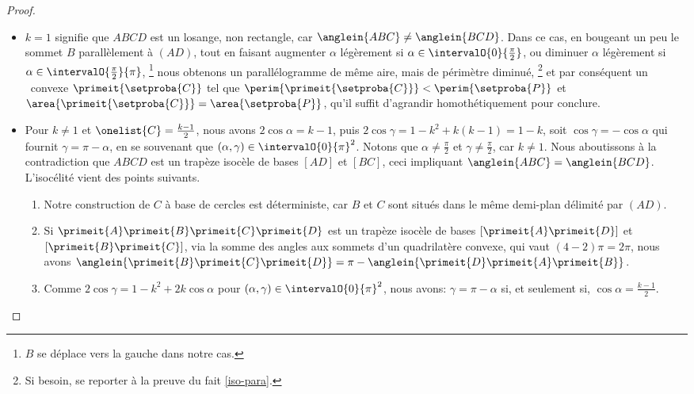 \begin{proof}
\begin{itemize}
        \item $k = 1$ signifie que $ABCD$ est un losange, non rectangle, car $\anglein{ABC} \neq \anglein{BCD}$.
        Dans ce cas, en bougeant un peu le sommet $B$ parallèlement à $(AD)$, tout en faisant
        augmenter $\alpha$ légèrement si $\alpha \in \intervalO{0}{\frac{\pi}{2}}$,
        ou
        diminuer $\alpha$ légèrement si $\alpha \in \intervalO{\frac{\pi}{2}}{\pi}$,%
        \footnote{
            $B$ se déplace vers la gauche dans notre cas.
        }
        nous obtenons un parallélogramme de même aire, mais de périmètre diminué,%
        \footnote{
            Si besoin, se reporter à la preuve du fait \ref{iso-para}.
        }
        et par conséquent un \ngone\ convexe $\primeit{\setproba{C}}$ tel que
        $\perim{\primeit{\setproba{C}}} < \perim{\setproba{P}}$
        et
        $\area{\primeit{\setproba{C}}} = \area{\setproba{P}}$,
        qu'il suffit d'agrandir homothétiquement pour conclure.


        \item Pour $k \neq 1$ et $\onelist{C} = \frac{k - 1}{2}$,
        nous avons $2\cos \alpha = k - 1$,
        puis
        $2 \cos \gamma = 1 - k^2 + k(k - 1) = 1 - k$,
        soit
        $\cos \gamma = - \cos \alpha$ qui fournit
        $\gamma = \pi - \alpha$, en se souvenant que $(\alpha , \gamma) \in \intervalO{0}{\pi}^2$.
        Notons que $\alpha \neq \frac{\pi}{2}$ et $\gamma \neq \frac{\pi}{2}$, car $k \neq 1$.
        Nous aboutissons à la contradiction que $ABCD$ est un trapèze isocèle de bases $[AD]$ et $[BC]$, ceci impliquant $\anglein{ABC} = \anglein{BCD}$.
        L'isocélité vient des points suivants.
        \begin{enumerate}
            \item Notre construction de $C$ à base de cercles est déterministe, car $B$ et $C$ sont situés dans le même demi-plan délimité par $(AD)$.

            \item Si $\primeit{A} \primeit{B} \primeit{C} \primeit{D}$ est un trapèze isocèle de bases $[\primeit{A} \primeit{D}]$ et $[\primeit{B} \primeit{C}]$, via la somme des angles aux sommets d'un quadrilatère convexe, qui vaut $(4 - 2) \pi = 2 \pi$, nous avons
            $\anglein{\primeit{B} \primeit{C} \primeit{D}} = \pi - \anglein{\primeit{D} \primeit{A} \primeit{B}}$.

            \item Comme $2 \cos \gamma = 1 - k^2 + 2 k \cos \alpha$ pour $(\alpha, \gamma) \in \intervalO{0}{\pi}^2$,
            nous avons:
            $\gamma = \pi - \alpha$ si, et seulement si, $\cos \alpha = \frac{k - 1}{2}$.
        \end{enumerate}



\end{itemize}
\end{proof}
